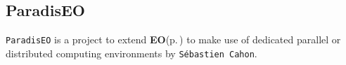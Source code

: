 \subsection*{Paradis\-EO}

{\tt Paradis\-EO} is a project to extend {\bf EO}{\rm (p.\,\pageref{class_e_o})} to make use of dedicated parallel or distributed computing environments by {\tt S\'{e}bastien Cahon}. 